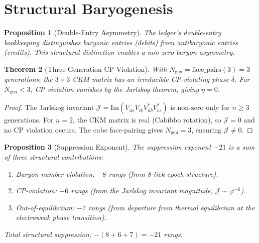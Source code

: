 \documentclass[12pt,a4paper]{article}
\newtheorem{theorem}{Theorem}[section]
\newtheorem{proposition}[theorem]{Proposition}
\theoremstyle{definition}
\theoremstyle{remark}
\begin{document}
\section{Structural Baryogenesis}
\label{sec:baryogenesis}

\begin{proposition}[Double-Entry Asymmetry]
\label{thm:double-entry}
The ledger's double-entry bookkeeping distinguishes baryonic
entries (debits) from antibaryonic entries (credits).  This
structural distinction enables a non-zero baryon asymmetry.
\end{proposition}

\begin{theorem}[Three-Generation CP Violation]
\label{thm:three-gen}
With $N_{\mathrm{gen}} = \mathrm{face\_pairs}(3) = 3$
generations, the $3 \times 3$ CKM matrix has an irreducible
CP-violating phase $\delta$.  For $N_{\mathrm{gen}} < 3$, CP
violation vanishes by the Jarlskog theorem, giving $\eta = 0$.
\end{theorem}

\begin{proof}
The Jarlskog invariant $\mathcal{J} = \mathrm{Im}(V_{us}
V_{cb} V_{ub}^* V_{cs}^*)$ is non-zero only for $n \geq 3$
generations.  For $n = 2$, the CKM matrix is real (Cabibbo
rotation), so $\mathcal{J} = 0$ and no CP violation occurs.
The cube face-pairing gives $N_{\mathrm{gen}} = 3$, ensuring
$\mathcal{J} \neq 0$.
\end{proof}

\begin{proposition}[Suppression Exponent]
\label{thm:exponent}
The suppression exponent $-21$ is a sum of three structural contributions:
\begin{enumerate}[label=(\roman*)]
  \item Baryon-number violation: $-8$ rungs
  (from 8-tick epoch structure).
  \item CP-violation: $-6$ rungs (from the
  Jarlskog invariant magnitude, $\mathcal{J} \sim \varphi^{-6}$).
  \item Out-of-equilibrium: $-7$ rungs (from
  departure from thermal equilibrium at the electroweak phase
  transition).
\end{enumerate}
Total structural suppression: $-(8+6+7) = -21$ rungs.
\end{proposition}

\end{document}
